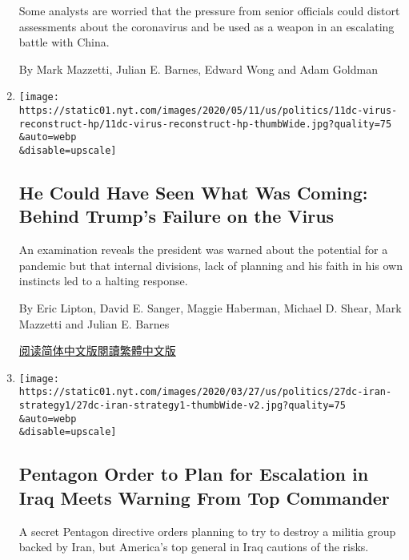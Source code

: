 \begin{enumerate}
  Some analysts are worried that the pressure from senior officials
  could distort assessments about the coronavirus and be used as a
  weapon in an escalating battle with China.

  By Mark Mazzetti, Julian E. Barnes, Edward Wong and Adam Goldman
\item
  \href{/2020/04/11/us/politics/coronavirus-trump-response.html}{}

  \texttt{[image: https://static01.nyt.com/images/2020/05/11/us/politics/11dc-virus-reconstruct-hp/11dc-virus-reconstruct-hp-thumbWide.jpg?quality=75\\\&auto=webp\\\&disable=upscale]}

  \hypertarget{he-could-have-seen-what-was-coming-behind-trumps-failure-on-the-virus}{%
  \subsection{He Could Have Seen What Was Coming: Behind Trump's Failure
  on the
  Virus}\label{he-could-have-seen-what-was-coming-behind-trumps-failure-on-the-virus}}

  An examination reveals the president was warned about the potential
  for a pandemic but that internal divisions, lack of planning and his
  faith in his own instincts led to a halting response.

  By Eric Lipton, David E. Sanger, Maggie Haberman, Michael D. Shear,
  Mark Mazzetti and Julian E. Barnes

  \href{https://cn.nytimes.com/usa/20200413/coronavirus-trump-response/}{阅读简体中文版}\href{https://cn.nytimes.com/usa/20200413/coronavirus-trump-response/zh-hant/}{閱讀繁體中文版}
\item
  \href{/2020/03/27/world/middleeast/pentagon-iran-iraq-militias-coronavirus.html}{}

  \texttt{[image: https://static01.nyt.com/images/2020/03/27/us/politics/27dc-iran-strategy1/27dc-iran-strategy1-thumbWide-v2.jpg?quality=75\\\&auto=webp\\\&disable=upscale]}

  \hypertarget{pentagon-order-to-plan-for-escalation-in-iraq-meets-warning-from-top-commander}{%
  \subsection{Pentagon Order to Plan for Escalation in Iraq Meets
  Warning From Top
  Commander}\label{pentagon-order-to-plan-for-escalation-in-iraq-meets-warning-from-top-commander}}

  A secret Pentagon directive orders planning to try to destroy a
  militia group backed by Iran, but America's top general in Iraq
  cautions of the risks.


\end{enumerate}
